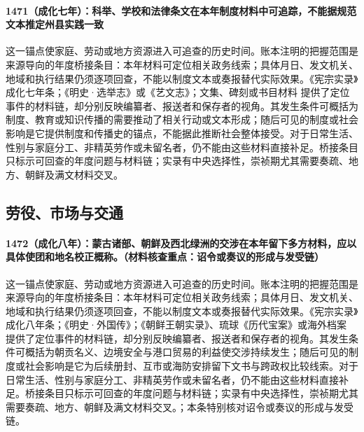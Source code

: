 \paragraph{1471（成化七年）：科举、学校和法律条文在本年制度材料中可追踪，不能据规范文本推定州县实践一致} 这一锚点使家庭、劳动或地方资源进入可追查的历史时间。账本注明的把握范围是来源导向的年度桥接条目：本年材料可定位相关政务线索；具体月日、发文机关、地域和执行结果仍须逐项回查，不能以制度文本或奏报替代实际效果。《宪宗实录》成化七年条；《明史·选举志》或《艺文志》；文集、碑刻或书目材料 提供了定位事件的材料链，却分别反映编纂者、报送者和保存者的视角。其发生条件可概括为制度、教育或知识传播的需要推动了相关行动或文本形成；随后可见的制度或社会影响是它提供制度和传播史的锚点，不能据此推断社会整体接受。对于日常生活、性别与家庭分工、非精英劳作或未留名者，仍不能由这些材料直接补足。桥接条目只标示可回查的年度问题与材料链；实录有中央选择性，崇祯期尤其需要奏疏、地方、朝鲜及满文材料交叉。

\subsection{劳役、市场与交通}

\paragraph{1472（成化八年）：蒙古诸部、朝鲜及西北绿洲的交涉在本年留下多方材料，应以具体使团和地名校正概称。（材料核查重点：诏令或奏议的形成与发受链）} 这一锚点使家庭、劳动或地方资源进入可追查的历史时间。账本注明的把握范围是来源导向的年度桥接条目：本年材料可定位相关政务线索；具体月日、发文机关、地域和执行结果仍须逐项回查，不能以制度文本或奏报替代实际效果。《宪宗实录》成化八年条；《明史·外国传》；《朝鲜王朝实录》、琉球《历代宝案》或海外档案 提供了定位事件的材料链，却分别反映编纂者、报送者和保存者的视角。其发生条件可概括为朝贡名义、边境安全与港口贸易的利益使交涉持续发生；随后可见的制度或社会影响是它为后续册封、互市或海防安排留下文书与跨政权比较线索。对于日常生活、性别与家庭分工、非精英劳作或未留名者，仍不能由这些材料直接补足。桥接条目只标示可回查的年度问题与材料链；实录有中央选择性，崇祯期尤其需要奏疏、地方、朝鲜及满文材料交叉。；本条特别核对诏令或奏议的形成与发受链。

